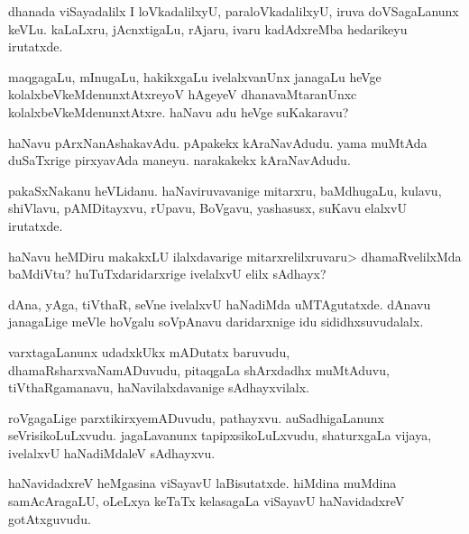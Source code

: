 \documentclass{article}
\begin{document}
\begin{mng}%
dhanada viSayadalilx I loVkadalilxyU, paraloVkadalilxyU,
iruva doVSagaLanunx keVLu. kaLaLxru, jAcnxtigaLu, rAjaru, ivaru kadAdxreMba
hedarikeyu irutatxde.
\end{mng}

\begin{mng}%
maqgagaLu, mInugaLu, hakikxgaLu ivelalxvanUnx janagaLu heVge
kolalxbeVkeMdenunxtAtxreyoV hAgeyeV dhanavaMtaranUnxc kolalxbeVkeMdenunxtAtxre.
haNavu adu heVge suKakaravu?
\end{mng}

\begin{mng}%
haNavu pArxNanAshakavAdu. pApakekx kAraNavAdudu. yama
muMtAda duSaTxrige pirxyavAda maneyu. narakakekx kAraNavAdudu.
\end{mng}

\begin{mng}%
pakaSxNakanu heVLidanu. haNaviruvavanige mitarxru, baMdhugaLu,
kulavu, shiVlavu, pAMDitayxvu, rUpavu, BoVgavu, yashasusx, suKavu elalxvU
irutatxde.
\end{mng}

\begin{mng}%
haNavu heMDiru makakxLU ilalxdavarige mitarxrelilxruvaru> dhamaRvelilxMda
baMdiVtu?  huTuTxdaridarxrige ivelalxvU elilx sAdhayx?
\end{mng}

\begin{mng}%
dAna, yAga, tiVthaR, seVne ivelalxvU haNadiMda uMTAgutatxde.
dAnavu  janagaLige meVle hoVgalu soVpAnavu daridarxnige idu
sididhxsuvudalalx.
\end{mng}

\begin{mng}%
varxtagaLanunx udadxkUkx mADutatx baruvudu, dhamaRsharxvaNamADuvudu, pitaqgaLa shArxdadhx muMtAduvu, tiVthaRgamanavu, haNavilalxdavanige
sAdhayxvilalx.
\end{mng}

\begin{mng}%
roVgagaLige parxtikirxyemADuvudu, pathayxvu. auSadhigaLanunx
seVrisikoLuLxvudu. jagaLavanunx tapipxsikoLuLxvudu, shaturxgaLa vijaya, ivelalxvU
haNadiMdaleV sAdhayxvu.
\end{mng}

\begin{mng}%
haNavidadxreV heMgasina viSayavU laBisutatxde. hiMdina muMdina
samAcAragaLU, oLeLxya keTaTx kelasagaLa viSayavU haNavidadxreV gotAtxguvudu.
\end{mng}
\end{document}

